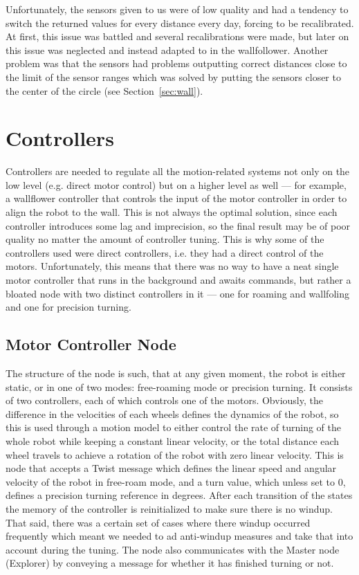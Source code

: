 Unfortunately, the sensors given to us were of low quality and had a tendency to
switch the returned values for every distance every day, forcing to be
recalibrated. At first, this issue was battled and several recalibrations were
made, but later on this issue was neglected and instead adapted to in the
wallfollower. Another problem was that the sensors had problems outputting
correct distances close to the limit of the sensor ranges which was solved by
putting the sensors closer to the center of the circle (see Section~\ref{sec:wall}).

\section{Controllers}
Controllers are needed to regulate all the motion-related systems not only on
the low level (e.g. direct motor control) but on a higher level as well --- for
example, a wallflower controller that controls the input of the motor controller
in order to align the robot to the wall. This is not always the optimal
solution, since each controller introduces some lag and imprecision, so the
final result may be of poor quality no matter the amount of controller tuning.
This is why some of the controllers used were direct controllers, i.e. they had
a direct control of the motors. Unfortunately, this means that there was no way
to have a neat single motor controller that runs in the background and awaits
commands, but rather a bloated node with two distinct controllers in it --- one
for roaming and wallfoling and one for precision turning.

\subsection{Motor Controller Node}
The structure of the node is such, that at any given moment, the robot is either
static, or in one of two modes: free-roaming mode or precision turning. It
consists of two controllers, each of which controls one of the motors.
Obviously, the difference in the velocities of each wheels defines the dynamics
of the robot, so this is used through a motion model to either control the rate
of turning of the whole robot while keeping a constant linear velocity, or the
total distance each wheel travels to achieve a rotation of the robot with zero
linear velocity. This is node that accepts a Twist message which defines the
linear speed and angular velocity of the robot in free-roam mode, and a turn
value, which unless set to 0, defines a precision turning reference in degrees.
After each transition of the states the memory of the controller is
reinitialized to make sure there is no windup. That said, there was a certain
set of cases where there windup occurred frequently which meant we needed to ad
anti-windup measures and take that into account during the tuning. The node also
communicates with the Master node (Explorer) by conveying a message for whether
it has finished turning or not.

